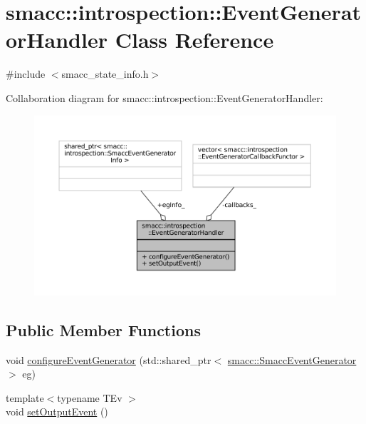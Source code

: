 \hypertarget{classsmacc_1_1introspection_1_1EventGeneratorHandler}{}\section{smacc\+:\+:introspection\+:\+:Event\+Generator\+Handler Class Reference}
\label{classsmacc_1_1introspection_1_1EventGeneratorHandler}


{\ttfamily \#include $<$smacc\+\_\+state\+\_\+info.\+h$>$}



Collaboration diagram for smacc\+:\+:introspection\+:\+:Event\+Generator\+Handler\+:
\nopagebreak
\begin{figure}[H]
\begin{center}
\leavevmode
\includegraphics[width=350pt]{classsmacc_1_1introspection_1_1EventGeneratorHandler__coll__graph}
\end{center}
\end{figure}
\subsection*{Public Member Functions}
\begin{DoxyCompactItemize}
\item 
void \hyperlink{classsmacc_1_1introspection_1_1EventGeneratorHandler_a2972060b50361e1c0d8fff8dff79385a}{configure\+Event\+Generator} (std\+::shared\+\_\+ptr$<$ \hyperlink{classsmacc_1_1SmaccEventGenerator}{smacc\+::\+Smacc\+Event\+Generator} $>$ eg)
\item 
{\footnotesize template$<$typename T\+Ev $>$ }\\void \hyperlink{classsmacc_1_1introspection_1_1EventGeneratorHandler_a7200f1d3a2a7a919aeaf801ee188264c}{set\+Output\+Event} ()
\end{DoxyCompactItemize}
